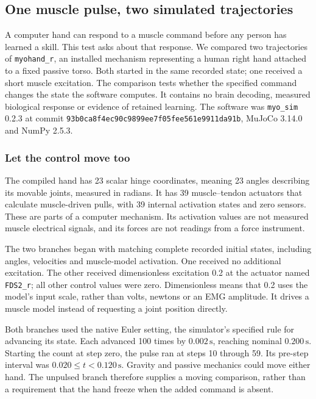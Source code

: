 \subsection{One muscle pulse, two simulated trajectories}

A computer hand can respond to a muscle command before any person has learned a skill. This test asks about that response. We compared two trajectories of \texttt{myohand\_r}, an installed mechanism representing a human right hand attached to a fixed passive torso. Both started in the same recorded state; one received a short muscle excitation. The comparison tests whether the specified command changes the state the software computes. It contains no brain decoding, measured biological response or evidence of retained learning. The software was \texttt{myo\_sim} 0.2.3 at commit \texttt{93b0ca8f4ec90c9899ee7f05fee561e9911da91b}, MuJoCo 3.14.0 and NumPy 2.5.3.\cite{myohandMyoSimPinned2026,myohandMuJoCo3140,mujoco2012,myohandNumericalRecord20261105}

\subsubsection{Let the control move too}

The compiled hand has 23 scalar hinge coordinates, meaning 23 angles describing its movable joints, measured in radians. It has 39 muscle--tendon actuators that calculate muscle-driven pulls, with 39 internal activation states and zero sensors. These are parts of a computer mechanism. Its activation values are not measured muscle electrical signals, and its forces are not readings from a force instrument.

The two branches began with matching complete recorded initial states, including angles, velocities and muscle-model activation. One received no additional excitation. The other received dimensionless excitation 0.2 at the actuator named \texttt{FDS2\_r}; all other control values were zero. Dimensionless means that 0.2 uses the model's input scale, rather than volts, newtons or an EMG amplitude. It drives a muscle model instead of requesting a joint position directly.

Both branches used the native Euler setting, the simulator's specified rule for advancing its state. Each advanced 100 times by $0.002\,\mathrm{s}$, reaching nominal $0.200\,\mathrm{s}$. Starting the count at step zero, the pulse ran at steps 10 through 59. Its pre-step interval was $0.020\leq t<0.120\,\mathrm{s}$. Gravity and passive mechanics could move either hand. The unpulsed branch therefore supplies a moving comparison, rather than a requirement that the hand freeze when the added command is absent.

